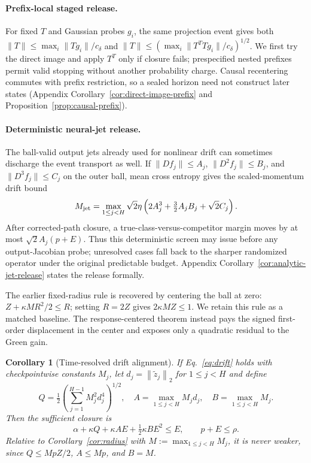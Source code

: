 \documentclass{article}
\newtheorem{corollary}{Corollary}
\newcommand{\norm}[1]{\left\lVert #1\right\rVert_2}
\begin{document}
\paragraph{Prefix-local staged release.}
For fixed $T$ and Gaussian probes $g_i$, the same projection event gives both
$\|T\|\le\max_i\|Tg_i\|/c_\delta$ and
$\|T\|\le(\max_i\|T^TTg_i\|/c_\delta)^{1/2}$.  We first try the direct image
and apply $T^T$ only if closure fails; prespecified nested prefixes permit valid
stopping without another probability charge.  Causal recentering commutes with
prefix restriction, so a sealed horizon need not construct later states
(Appendix Corollary~\ref{cor:direct-image-prefix} and
Proposition~\ref{prop:causal-prefix}).

\paragraph{Deterministic neural-jet release.}
The ball-valid output jets already used for nonlinear drift can sometimes
discharge the event transport as well.  If
$\|Df_j\|\le A_j$, $\|D^2f_j\|\le B_j$, and
$\|D^3f_j\|\le C_j$ on the outer ball, mean cross entropy gives the
scaled-momentum drift bound
\begin{equation}
 M_{\rm jet}=\max_{1\le j<H}\sqrt2\eta
 \left(2A_j^3+\tfrac32A_jB_j+\sqrt2C_j\right).
 \label{eq:analytic-jet-drift}
\end{equation}
After corrected-path closure, a true-class-versus-competitor margin moves by
at most $\sqrt2A_j(p+E)$.  Thus this deterministic screen may issue before any
output-Jacobian probe; unresolved cases fall back to the sharper randomized
operator under the original predictable budget.  Appendix
Corollary~\ref{cor:analytic-jet-release} states the release formally.

The earlier fixed-radius rule is recovered by centering the ball at zero:
$Z+\kappa MR^2/2\le R$; setting $R=2Z$ gives
$2\kappa MZ\le1$.  We retain this rule as a matched baseline.  The
response-centered theorem instead pays the signed first-order displacement in
the center and exposes only a quadratic residual to the Green gain.

\begin{corollary}[Time-resolved drift alignment]
\label{cor:heterogeneous}
If Eq.~\eqref{eq:drift} holds with checkpointwise constants $M_j$, let
$d_j=\norm{\widetilde z_j}$ for $1\le j<H$ and define
\begin{equation}
 Q=\tfrac12\left(\sum_{j=1}^{H-1}M_j^2d_j^4\right)^{1/2},\quad
 A=\max_{1\le j<H}M_jd_j,\quad B=\max_{1\le j<H}M_j.
 \label{eq:heterogeneous-constants}
\end{equation}
Then the sufficient closure is
\begin{equation}
 \alpha+\kappa Q+\kappa AE+\tfrac12\kappa BE^2\le E,
 \qquad p+E\le\rho.
 \label{eq:heterogeneous-closure}
\end{equation}
Relative to Corollary~\ref{cor:radius} with
$M:=\max_{1\le j<H}M_j$, it is never weaker, since
$Q\le MpZ/2$, $A\le Mp$, and $B=M$.
\end{corollary}
\end{document}
